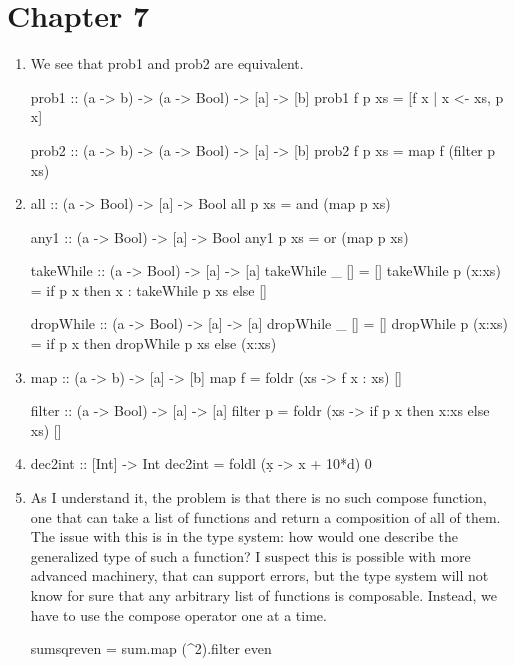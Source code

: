 \documentclass{article}
\begin{document}
\section{Chapter 7}
\begin{enumerate}
\item  We see that prob1 and prob2 are equivalent. 
\begin{code}
prob1 :: (a -> b) -> (a -> Bool) -> [a] -> [b]
prob1 f p xs = [f x | x <- xs, p x]

prob2 :: (a -> b) -> (a -> Bool) -> [a] -> [b]
prob2 f p xs = map f (filter p xs)
\end{code}

\item 
\begin{code}
all :: (a -> Bool) -> [a] -> Bool
all p xs = and (map p xs)
\end{code}

\begin{code}
any1 :: (a -> Bool) -> [a] -> Bool
any1 p xs = or (map p xs)
\end{code}

\begin{code}
takeWhile :: (a -> Bool) -> [a] -> [a]
takeWhile _ [] = []
takeWhile p (x:xs) = if p x then x : takeWhile p xs else []
\end{code}

\begin{code}
dropWhile :: (a -> Bool) -> [a] -> [a]
dropWhile _ [] = []
dropWhile p (x:xs) = if p x then dropWhile p xs else (x:xs)
\end{code}

\item
\begin{code}
map :: (a -> b) -> [a] -> [b]
map f = foldr (\x xs -> f x : xs) [] 
\end{code}

\begin{code}
filter :: (a -> Bool) -> [a] -> [a]
filter p = foldr (\x xs -> if p x then x:xs else xs) []
\end{code}

\item 
\begin{code}
dec2int :: [Int] -> Int
dec2int = foldl (\d x -> x + 10*d) 0
\end{code}

\item As I understand it, the problem is that there is no such compose function, one that can take a list of functions and return a composition of all of them. The issue with this is in the type system: how would one describe the generalized type of such a function? I suspect this is possible with more advanced machinery, that can support errors, but the type system will not know for sure that any arbitrary list of functions is composable. Instead, we have to use the compose operator one at a time.
\begin{code}
sumsqreven = sum.map (^2).filter even
\end{code} 


\end{enumerate}
\end{document}
